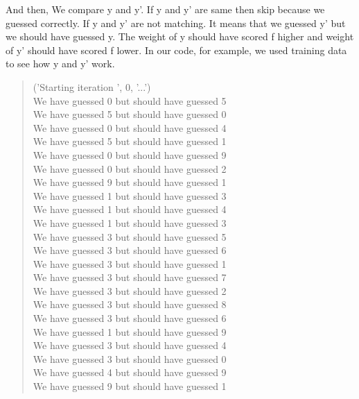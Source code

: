 \documentclass{article}
\begin{document}
        And then, We compare y and y'. If y and y' are same then skip because we guessed correctly. If y and y' are not matching. It means that we guessed y' but we should have guessed y. The weight of y should have scored f higher and weight of y' should have scored f lower. \newline
        In our code, for example, we used training data to see how y and y' work. \newline
        \begin{quote}
        ('Starting iteration ', 0, '...')\\
        We have guessed 0 but should have guessed 5\\
        We have guessed 5 but should have guessed 0\\
        We have guessed 0 but should have guessed 4\\
        We have guessed 5 but should have guessed 1\\
        We have guessed 0 but should have guessed 9\\
        We have guessed 0 but should have guessed 2\\
        We have guessed 9 but should have guessed 1\\
        We have guessed 1 but should have guessed 3\\
        We have guessed 1 but should have guessed 4\\
        We have guessed 1 but should have guessed 3\\
        We have guessed 3 but should have guessed 5\\
        We have guessed 3 but should have guessed 6\\
        We have guessed 3 but should have guessed 1\\
        We have guessed 3 but should have guessed 7\\
        We have guessed 3 but should have guessed 2\\
        We have guessed 3 but should have guessed 8\\
        We have guessed 3 but should have guessed 6\\
        We have guessed 1 but should have guessed 9\\
        We have guessed 3 but should have guessed 4\\
        We have guessed 3 but should have guessed 0\\
        We have guessed 4 but should have guessed 9\\
        We have guessed 9 but should have guessed 1\\

\end{quote}
\end{document}
